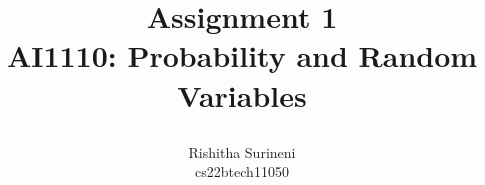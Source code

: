 \documentclass[journal,12pt,twocolumn]{IEEEtran}
\begin{document}
\let\vec\mathbf

\vspace{3cm}

\title{
\textbf{Assignment 1} \\ \large \textbf{AI1110}: Probability and Random Variables 


}
\author{ Rishitha Surineni\\ cs22btech11050} 
	



\maketitle

\newpage


\bigskip

\renewcommand{\thefigure}{\theenumi}
\renewcommand{\thetable}{\theenumi}
\end{document}

